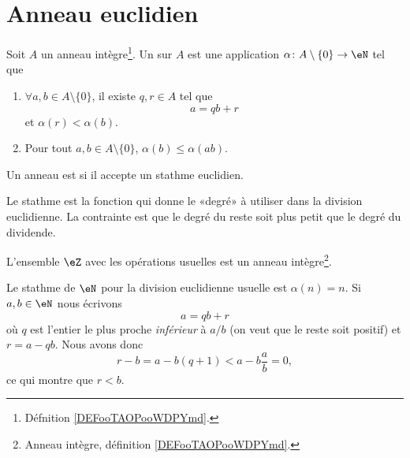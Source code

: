 \section{Anneau euclidien}

\begin{definition} \label{DefAXitWRL}
	Soit \( A\) un anneau intègre\footnote{Défnition \ref{DEFooTAOPooWDPYmd}.}. Un  sur \( A\) est une application \( \alpha\colon A\setminus\{ 0 \}\to \eN\) tel que
	\begin{enumerate}
		\item       \label{ITEMooLVJAooLpjgEz}
		      \( \forall a,b\in A\setminus\{ 0 \}\), il existe \( q,r\in A\) tel que
		      \begin{equation}
			      a=qb+r
		      \end{equation}
		      et \( \alpha(r)<\alpha(b)\).
		\item
		      Pour tout \( a,b\in A\setminus\{ 0 \}\), \( \alpha(b)\leq \alpha(ab)\).
	\end{enumerate}
	Un anneau est  si il accepte un stathme euclidien.
\end{definition}
Le stathme est la fonction qui donne le «degré» à utiliser dans la division euclidienne. La contrainte est que le degré du reste soit plus petit que le degré du dividende.

\begin{lemma}       \label{LEMooFUSTooDCcBDb}
	L'ensemble \( \eZ\) avec les opérations usuelles est un anneau intègre\footnote{Anneau intègre, définition \ref{DEFooTAOPooWDPYmd}.}.
\end{lemma}

\begin{example} \label{ExwqlCwvV}
	Le stathme de \( \eN\) pour la division euclidienne usuelle est \( \alpha(n)=n\). Si \( a,b\in \eN\) nous écrivons
	\begin{equation}
		a=qb+r
	\end{equation}
	où \( q\) est l'entier le plus proche \emph{inférieur} à \( a/b\) (on veut que le reste soit positif) et \( r=a-qb\). Nous avons donc
	\begin{equation}
		r-b=a-b(q+1)<a-b\frac{ a }{ b }=0,
	\end{equation}
	ce qui montre que \( r<b\).
\end{example}

